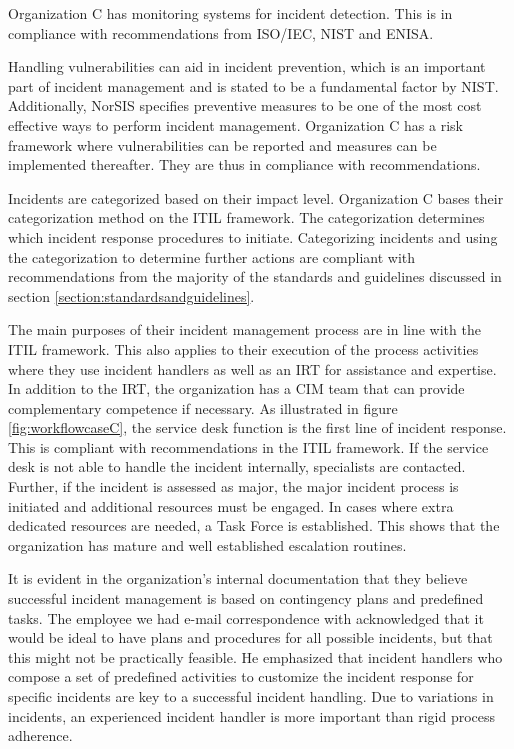 Organization C has monitoring systems for incident detection. This is in compliance with recommendations from ISO/IEC, NIST and ENISA. 

Handling vulnerabilities can aid in incident prevention, which is an important part of incident management and is stated to be a fundamental factor by NIST. Additionally, NorSIS specifies preventive measures to be one of the most cost effective ways to perform incident management. Organization C has a risk framework where vulnerabilities can be reported and measures can be implemented thereafter. They are thus in compliance with recommendations.

Incidents are categorized based on their impact level. Organization C bases their categorization method on the ITIL framework. The categorization determines which incident response procedures to initiate. Categorizing incidents and using the categorization to determine further actions are compliant with recommendations from the majority of the standards and guidelines discussed in section \ref{section:standardsandguidelines}.

The main purposes of their incident management process are in line with the ITIL framework. This also applies to their execution of the process activities where they use incident handlers as well as an \ac{IRT} for assistance and expertise. In addition to the IRT, the organization has a \ac{CIM} team that can provide complementary competence if necessary. As illustrated in figure \ref{fig:workflowcaseC}, the service desk function is the first line of incident response. This is compliant with recommendations in the ITIL framework. If the service desk is not able to handle the incident internally, specialists are contacted. Further, if the incident is assessed as major, the major incident process is initiated and additional resources must be engaged. In cases where extra dedicated resources are needed, a Task Force is established. This shows that the organization has mature and well established escalation routines.

It is evident in the organization's internal documentation that they believe successful incident management is based on contingency plans and predefined tasks. The employee we had e-mail correspondence with acknowledged that it would be ideal to have plans and procedures for all possible incidents, but that this might not be practically feasible. He emphasized that incident handlers who compose a set of predefined activities to customize the incident response for specific incidents are key to a successful incident handling. Due to variations in incidents, an experienced incident handler is more important than rigid process adherence.

